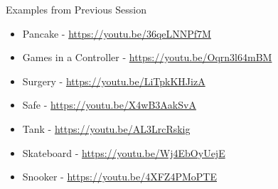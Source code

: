 \begin{frame}{Examples from Previous Session}
\begin{itemize}
	\item Pancake - \url{https://youtu.be/36qeLNNPf7M}
	\item Games in a Controller - \url{https://youtu.be/Oqrn3l64mBM}
	\item Surgery - \url{https://youtu.be/LiTpkKHJizA}
	\item Safe - \url{https://youtu.be/X4wB3AakSvA}
	\item Tank - \url{https://youtu.be/AL3LrcRskig}
	\item Skateboard - \url{https://youtu.be/Wj4EbOyUejE}
	\item Snooker -  \url{https://youtu.be/4XFZ4PMoPTE}
\end{itemize}
\end{frame}